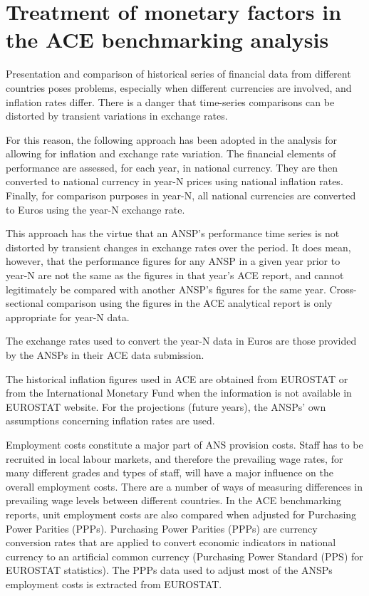 \documentclass[
  11pt,
  a4paperpaper,
  openany,headsepline=on,footsepline=off,DIV=12,table]{scrbook}
\begin{document}

\chapter{Treatment of monetary factors in the ACE benchmarking
analysis}\label{treatment-of-monetary-factors-in-the-ace-benchmarking-analysis}

Presentation and comparison of historical series of financial data from
different countries poses problems, especially when different currencies
are involved, and inflation rates differ. There is a danger that
time-series comparisons can be distorted by transient variations in
exchange rates.

For this reason, the following approach has been adopted in the analysis
for allowing for inflation and exchange rate variation. The financial
elements of performance are assessed, for each year, in national
currency. They are then converted to national currency in year-N prices
using national inflation rates. Finally, for comparison purposes in
year-N, all national currencies are converted to Euros using the year-N
exchange rate.

This approach has the virtue that an ANSP's performance time series is
not distorted by transient changes in exchange rates over the period. It
does mean, however, that the performance figures for any ANSP in a given
year prior to year-N are not the same as the figures in that year's ACE
report, and cannot legitimately be compared with another ANSP's figures
for the same year. Cross-sectional comparison using the figures in the
ACE analytical report is only appropriate for year-N data.

The exchange rates used to convert the year-N data in Euros are those
provided by the ANSPs in their ACE data submission.

The historical inflation figures used in ACE are obtained from EUROSTAT
or from the International Monetary Fund when the information is not
available in EUROSTAT website. For the projections (future years), the
ANSPs' own assumptions concerning inflation rates are used.

Employment costs constitute a major part of ANS provision costs. Staff
has to be recruited in local labour markets, and therefore the
prevailing wage rates, for many different grades and types of staff,
will have a major influence on the overall employment costs. There are a
number of ways of measuring differences in prevailing wage levels
between different countries. In the ACE benchmarking reports, unit
employment costs are also compared when adjusted for Purchasing Power
Parities (PPPs). Purchasing Power Parities (PPPs) are currency
conversion rates that are applied to convert economic indicators in
national currency to an artificial common currency (Purchasing Power
Standard (PPS) for EUROSTAT statistics). The PPPs data used to adjust
most of the ANSPs employment costs is extracted from EUROSTAT.
\end{document}
